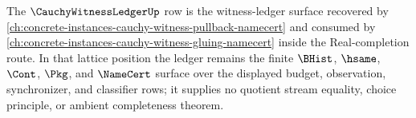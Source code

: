 The $\CauchyWitnessLedgerUp$ row is the witness-ledger surface recovered by \autoref{ch:concrete-instances-cauchy-witness-pullback-namecert} and consumed by \autoref{ch:concrete-instances-cauchy-witness-gluing-namecert} inside the Real-completion route. In that lattice position the ledger remains the finite $\BHist$, $\hsame$, $\Cont$, $\Pkg$, and $\NameCert$ surface over the displayed budget, observation, synchronizer, and classifier rows; it supplies no quotient stream equality, choice principle, or ambient completeness theorem.
